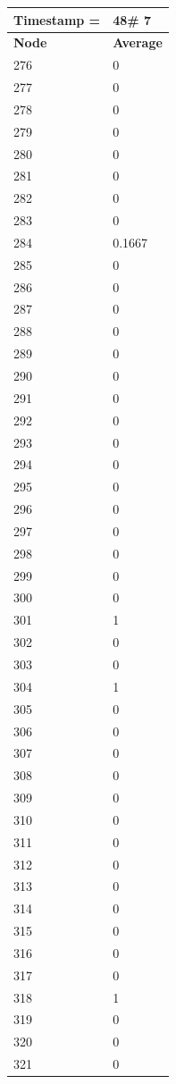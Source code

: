 \begin{tabular}{|l||l|}
\hline
\textbf{Timestamp =} & \textbf{48}\# 7\\\hline
	\textbf{Node} & \textbf{Average} \\ \hline
\hline
	276 & 0 \\ \hline
	277 & 0 \\ \hline
	278 & 0 \\ \hline
	279 & 0 \\ \hline
	280 & 0 \\ \hline
	281 & 0 \\ \hline
	282 & 0 \\ \hline
	283 & 0 \\ \hline
	284 & 0.1667 \\ \hline
	285 & 0 \\ \hline
	286 & 0 \\ \hline
	287 & 0 \\ \hline
	288 & 0 \\ \hline
	289 & 0 \\ \hline
	290 & 0 \\ \hline
	291 & 0 \\ \hline
	292 & 0 \\ \hline
	293 & 0 \\ \hline
	294 & 0 \\ \hline
	295 & 0 \\ \hline
	296 & 0 \\ \hline
	297 & 0 \\ \hline
	298 & 0 \\ \hline
	299 & 0 \\ \hline
	300 & 0 \\ \hline
	301 & 1 \\ \hline
	302 & 0 \\ \hline
	303 & 0 \\ \hline
	304 & 1 \\ \hline
	305 & 0 \\ \hline
	306 & 0 \\ \hline
	307 & 0 \\ \hline
	308 & 0 \\ \hline
	309 & 0 \\ \hline
	310 & 0 \\ \hline
	311 & 0 \\ \hline
	312 & 0 \\ \hline
	313 & 0 \\ \hline
	314 & 0 \\ \hline
	315 & 0 \\ \hline
	316 & 0 \\ \hline
	317 & 0 \\ \hline
	318 & 1 \\ \hline
	319 & 0 \\ \hline
	320 & 0 \\ \hline
	321 & 0 \\ \hline
\end{tabular}

